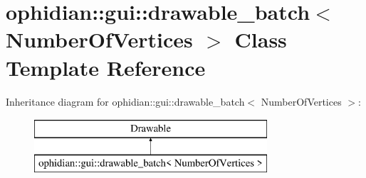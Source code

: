 \hypertarget{classophidian_1_1gui_1_1drawable__batch}{\section{ophidian\-:\-:gui\-:\-:drawable\-\_\-batch$<$ Number\-Of\-Vertices $>$ Class Template Reference}
\label{classophidian_1_1gui_1_1drawable__batch}
}
Inheritance diagram for ophidian\-:\-:gui\-:\-:drawable\-\_\-batch$<$ Number\-Of\-Vertices $>$\-:\begin{figure}[H]
\begin{center}
\leavevmode
\includegraphics[height=2.000000cm]{classophidian_1_1gui_1_1drawable__batch}
\end{center}
\end{figure}
